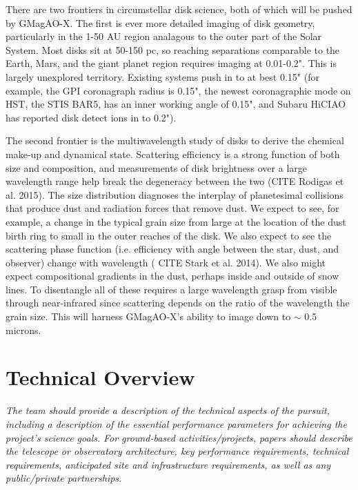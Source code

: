 \documentclass[12pt,preprint]{aastex}
\begin{document}
There are two frontiers in circumstellar disk science, both of which will be
pushed by GMagAO-X. The first is ever more detailed imaging of disk geometry,
particularly in the 1-50 AU region analagous to the outer part of the Solar
System. Most disks sit at 50-150 pc, so reaching separations comparable to the Earth, Mars, and the giant
planet region requires imaging at 0.01-0.2". This is largely unexplored
territory. Existing systems push in to at best 0.15" (for example, the GPI
coronagraph radius is 0.15", the newest coronagraphic mode on HST, the STIS
BAR5, has an inner working angle of 0.15", and Subaru HiCIAO has reported disk
detect ions in to 0.2").  

The second frontier is the multiwavelength study of disks to derive the
chemical make-up and dynamical state.  Scattering efficiency is a strong
function of both size and composition, and measurements of disk brightness
over a large wavelength range help break the degeneracy between the two
(CITE Rodigas et al. 2015). The size distribution diagnoses the interplay of
planetesimal collisions that produce dust and radiation forces that remove
dust. We expect to see, for example, a change in the typical grain size from
large at the location of the dust birth ring to small in the outer reaches of
the disk. We also expect to see the scattering phase function (i.e. efficiency
with angle between the star, dust, and observer) change with wavelength ( CITE Stark
et al. 2014). We also might expect compositional gradients in the dust,
perhaps inside and outside of snow lines. To disentangle all of these requires
a large wavelength grasp from visible through near-infrared since scattering
depends on the ratio of the wavelength the grain size. This will harness GMagAO-X's ability to
image down to $\sim$ 0.5 microns.

%


\section{Technical Overview}
\textit{The team should provide a description of the technical aspects of the
pursuit, including a description of the essential performance parameters for achieving the
project's science goals.}
\textit{For ground-based activities/projects, papers should describe the telescope or
observatory architecture, key performance requirements, technical requirements,
anticipated site and infrastructure requirements, as well as any public/private
partnerships.}
\end{document}
